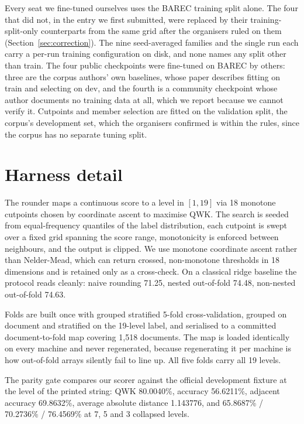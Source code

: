 Every seat we fine-tuned ourselves uses the BAREC training split alone. The four that did not,
in the entry we first submitted, were replaced by their training-split-only counterparts from
the same grid after the organisers ruled on them (Section~\ref{sec:correction}). The nine
seed-averaged families and the single run each carry a per-run training configuration on disk,
and none names any split other than train. The four public checkpoints were fine-tuned on
BAREC by others: three are the corpus authors' own baselines, whose paper describes fitting on
train and selecting on dev, and the fourth is a community checkpoint whose author documents no
training data at all, which we report because we cannot verify it. Cutpoints and member
selection are fitted on the validation split, the corpus's development set, which the
organisers confirmed is within the rules, since the corpus has no separate tuning split.

\section{Harness detail}
\label{app:harness}

The rounder maps a continuous score to a level in $[1,19]$ via 18 monotone cutpoints chosen
by coordinate ascent to maximise QWK. The search is seeded from equal-frequency quantiles of
the label distribution, each cutpoint is swept over a fixed grid spanning the score range,
monotonicity is enforced between neighbours, and the output is clipped. We use monotone
coordinate ascent rather than Nelder-Mead, which can return crossed, non-monotone thresholds
in 18 dimensions and is retained only as a cross-check. On a classical ridge baseline the
protocol reads cleanly: naive rounding 71.25, nested out-of-fold 74.48, non-nested
out-of-fold 74.63.

Folds are built once with grouped stratified 5-fold cross-validation, grouped on document
and stratified on the 19-level label, and serialised to a committed document-to-fold map
covering 1{,}518 documents. The map is loaded identically on every machine and never
regenerated, because regenerating it per machine is how out-of-fold arrays silently fail to
line up. All five folds carry all 19 levels.

The parity gate compares our scorer against the official development fixture at the level of
the printed string: QWK 80.0040\%, accuracy 56.6211\%, adjacent accuracy 69.8632\%, average
absolute distance 1.143776, and 65.8687\% / 70.2736\% / 76.4569\% at 7, 5 and 3 collapsed
levels.

